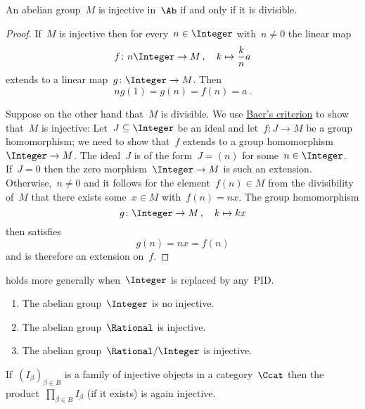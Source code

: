\begin{corollary}
  \label{injective iff divisible}
  An abelian group~$M$ is injective in~$\Ab$ if and only if it is divisible.
\end{corollary}


\begin{proof}
  If~$M$ is injective then for every~$n \in \Integer$ with~$n \neq 0$ the linear map
  \[
    f
    \colon
    n\Integer
    \to
    M \,,
    \quad
    k
    \mapsto
    \frac{k}{n} a
  \]
  extends to a linear map~$g \colon \Integer \to M$.
  Then
  \[
    n g(1)
    =
    g(n)
    =
    f(n)
    =
    a \,.
  \]
  
  Suppose on the other hand that~$M$ is divisible.
  We use \hyperref[baers criterion]{Baer’s criterion} to show that~$M$ is injective:
  Let~$J \subseteq \Integer$ be an ideal and let~$f \colon J \to M$ be a group homomorphism;
  we need to show that~$f$ extends to a group homomorphism~$\Integer \to M$.
  The ideal~$J$ is of the form~$J = (n)$ for some~$n \in \Integer$.
  If~$J = 0$ then the zero morphism~$\Integer \to M$ is such an extension.
  Otherwise,~$n \neq 0$ and it follows for the element~$f(n) \in M$ from the divisibility of~$M$ that there exists some~$x \in M$ with~$f(n) = n x$.
  The group homomorphism
  \[
    g
    \colon
    \Integer
    \to
    M \,,
    \quad
    k
    \mapsto
    k x
  \]
  then satisfies
  \[
    g(n)
    =
    n x
    =
    f(n)
  \]
  and is therefore an extension on~$f$.
\end{proof}


\begin{remark}
   holds more generally when~$\Integer$ is replaced by any~PID.
\end{remark}


\begin{example}
  \leavevmode
  \begin{enumerate}
    \item
      The abelian group~$\Integer$ is no injective.
    \item
      The abelian group~$\Rational$ is injective.
    \item
      The abelian group~$\Rational/\Integer$ is injective.
  \end{enumerate}
\end{example}


\begin{lemma}
  \label{product of injectives}
  If~$(I_\beta)_{\beta \in B}$ is a family of injective objects in a category~$\Ccat$ then the product~$\prod_{\beta \in B} I_\beta$ (if it exists) is again injective.
\end{lemma}


